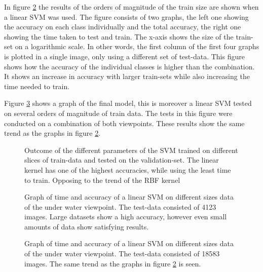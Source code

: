 In figure \ref{fig:lin1} the results of the orders of magnitude of the train size are shown when a linear SVM was used. The figure consists of two graphs, the left one showing the accuracy on each class individually and the total accuracy, the right one showing the time taken to test and train. The x-axis shows the size of the train-set on a logarithmic scale.
In other words, the first column of the first four graphs is plotted in a single image, only using a different set of test-data.
This figure shows how the accuracy of the individual classes is higher than the combination. It shows an increase in accuracy with larger train-sets while also increasing the time needed to train.

Figure \ref{fig:lin2} shows a graph of the final model, this is moreover a linear SVM tested on several orders of magnitude of train data.
The tests in this figure were conducted on a combination of both viewpoints.
These results show the same trend as the graphs in figure \ref{fig:lin1}.

\begin{figure}%
\centering
\ifx\showfig\undefined
 


 \fi
\caption{Outcome of the different parameters of the SVM trained on different slices of train-data and tested on the validation-set. The linear kernel has one of the highest accuracies, while using the least time to train. Opposing to the trend of the RBF kernel}
\label{fig:c14}
\end{figure}

\begin{figure}%
\centering
\ifx\showfig\undefined
 \fi
\caption{Graph of time and accuracy of a linear SVM on different sizes data of the under water viewpoint. The test-data consisted of 4123 images. Large datasets show a high accuracy, however even small amounts of data show satisfying results.}
\label{fig:lin1}
\end{figure}

\begin{figure}%
\centering
\ifx\showfig\undefined
 \fi
\caption{Graph of time and accuracy of a linear SVM on different sizes data of the under water viewpoint. The test-data consisted of 18583 images. The same trend as the graphs in figure \ref{fig:lin1} is seen.}
\label{fig:lin2}
\end{figure}

